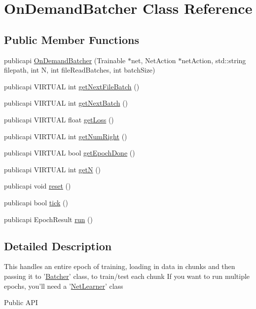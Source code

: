 \hypertarget{classOnDemandBatcher}{\section{On\-Demand\-Batcher Class Reference}
\label{classOnDemandBatcher}
}
\subsection*{Public Member Functions}
\begin{DoxyCompactItemize}
\item 
publicapi \hyperlink{classOnDemandBatcher_aafdf6b1cd51f52ba6f4664e6d7fafedc}{On\-Demand\-Batcher} (Trainable $\ast$net, Net\-Action $\ast$net\-Action, std\-::string filepath, int N, int file\-Read\-Batches, int batch\-Size)
\item 
publicapi V\-I\-R\-T\-U\-A\-L int \hyperlink{classOnDemandBatcher_a9f591582d681110003e46c9d9c3d9ad2}{get\-Next\-File\-Batch} ()
\item 
publicapi V\-I\-R\-T\-U\-A\-L int \hyperlink{classOnDemandBatcher_a2e728b9916c4a32b1932b9026125a3c9}{get\-Next\-Batch} ()
\item 
publicapi V\-I\-R\-T\-U\-A\-L float \hyperlink{classOnDemandBatcher_ad14816d704e9e654bf1ccfc23dc5f161}{get\-Loss} ()
\item 
publicapi V\-I\-R\-T\-U\-A\-L int \hyperlink{classOnDemandBatcher_ad053841c3f629bb7c489ce6d156cd42e}{get\-Num\-Right} ()
\item 
publicapi V\-I\-R\-T\-U\-A\-L bool \hyperlink{classOnDemandBatcher_a831040bac362a349c338f89537a4408f}{get\-Epoch\-Done} ()
\item 
publicapi V\-I\-R\-T\-U\-A\-L int \hyperlink{classOnDemandBatcher_a59b6fbce7ba9502046a8d25641c19c9b}{get\-N} ()
\item 
publicapi void \hyperlink{classOnDemandBatcher_a2ce361fe87c3be1c85904bd22a0aa39b}{reset} ()
\item 
publicapi bool \hyperlink{classOnDemandBatcher_afbfbd27f32c26b240f74a2aa8290c6fe}{tick} ()
\item 
publicapi Epoch\-Result \hyperlink{classOnDemandBatcher_ae03f6dff2a9313c318bb37bd1041edeb}{run} ()
\end{DoxyCompactItemize}


\subsection{Detailed Description}
This handles an entire epoch of training, loading in data in chunks and then passing it to '\hyperlink{classBatcher}{Batcher}' class, to train/test each chunk If you want to run multiple epochs, you'll need a '\hyperlink{classNetLearner}{Net\-Learner}' class \begin{DoxyParagraph}{Public A\-P\-I}

\end{DoxyParagraph}


